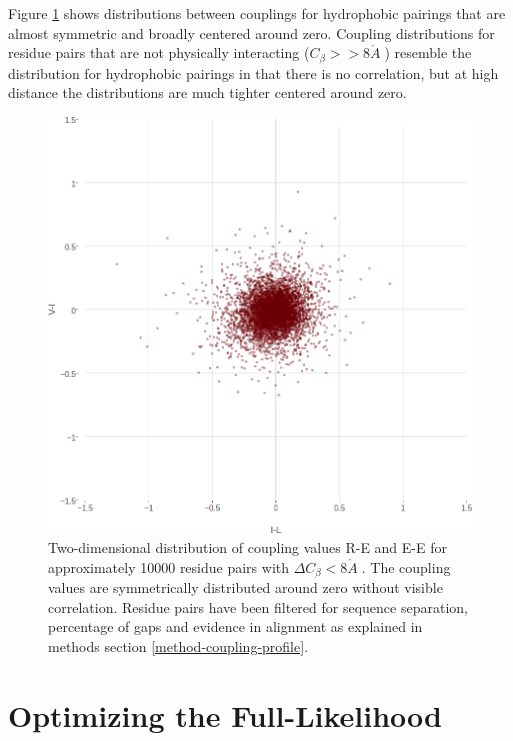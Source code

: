 \documentclass[12pt,a4paper,twoside]{book}
\newcommand{\Cb}{C_\beta}
\newcommand{\angstrom}{\mathring{A} \;}
\theoremstyle{definition}
\theoremstyle{definition}
\theoremstyle{remark}
\begin{document}
Figure \ref{fig:2d-coupling-profile-vi-il-0-8} shows distributions
between couplings for hydrophobic pairings that are almost symmetric and
broadly centered around zero. Coupling distributions for residue pairs
that are not physically interacting (\(\Cb >> 8 \angstrom\)) resemble
the distribution for hydrophobic pairings in that there is no
correlation, but at high distance the distributions are much tighter
centered around zero.









\begin{figure}
\includegraphics[width=0.75\linewidth]{img/coupling_matrix_analysis/pairwise_couplings_V-I_I-L_Cbdistance_0_8_notitle} \caption{Two-dimensional distribution
of coupling values R-E and E-E for approximately 10000 residue pairs
with \(\Delta\Cb < 8\angstrom\). The coupling values are symmetrically
distributed around zero without visible correlation. Residue pairs have
been filtered for sequence separation, percentage of gaps and evidence
in alignment as explained in methods section
\ref{method-coupling-profile}.}\label{fig:2d-coupling-profile-vi-il-0-8}
\end{figure}

\chapter{Optimizing the
Full-Likelihood}\label{optimizing-full-likelihood}
\end{document}
